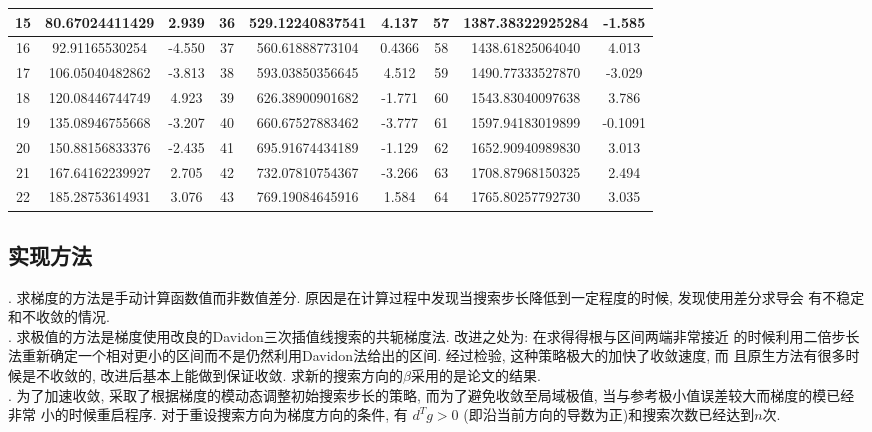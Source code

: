 \documentclass[UTF8]{ctexart}
\begin{document}
\begin{table}[H]
\begin{tabular}{|c|c|c|c|c|c|c|c|c|}
                    \hline
                    15&80.67024411429&2.939&36&529.12240837541&4.137&57&1387.38322925284&-1.585\\
                    \hline
                    16&92.91165530254&-4.550&37&560.61888773104&0.4366&58&1438.61825064040&4.013\\
                    \hline
                    17&106.05040482862&-3.813&38&593.03850356645&4.512&59&1490.77333527870&-3.029\\
                    \hline
                    18&120.08446744749&4.923&39&626.38900901682&-1.771&60&1543.83040097638&3.786\\
                    \hline
                    19&135.08946755668&-3.207&40&660.67527883462&-3.777&61&1597.94183019899&-0.1091\\
                    \hline
                    20&150.88156833376&-2.435&41&695.91674434189&-1.129&62&1652.90940989830&3.013\\
                    \hline
                    21&167.64162239927&2.705&42&732.07810754367&-3.266&63&1708.87968150325&2.494\\
                    \hline
                    22&185.28753614931&3.076&43&769.19084645916&1.584&64&1765.80257792730&3.035\\
                    \hline
                \end{tabular}
            \end{table}
        \subsection{实现方法}
            . 求梯度的方法是手动计算函数值而非数值差分. 原因是在计算过程中发现当搜索步长降低到一定程度的时候, 发现使用差分求导会
            有不稳定和不收敛的情况.\\
            . 求极值的方法是梯度使用改良的Davidon三次插值线搜索的共轭梯度法. 改进之处为: 在求得得根与区间两端非常接近
            的时候利用二倍步长法重新确定一个相对更小的区间而不是仍然利用Davidon法给出的区间. 经过检验, 这种策略极大的加快了收敛速度, 而
            且原生方法有很多时候是不收敛的, 改进后基本上能做到保证收敛. 求新的搜索方向的$\beta$采用的是论文\cite{Hager2005A}的结果.\\
            . 为了加速收敛, 采取了根据梯度的模动态调整初始搜索步长的策略, 而为了避免收敛至局域极值, 当与参考极小值误差较大而梯度的模已经非常
            小的时候重启程序. 对于重设搜索方向为梯度方向的条件, 有 $d^Tg>0$ (即沿当前方向的导数为正)和搜索次数已经达到$n$次.
\end{document}
